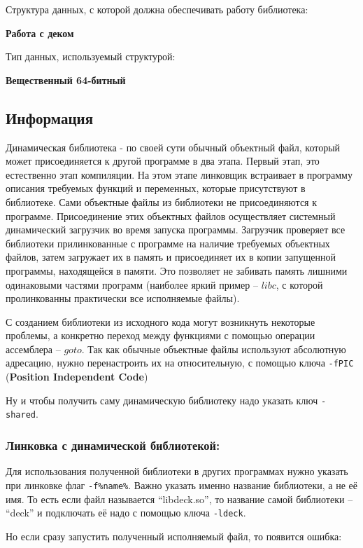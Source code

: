 \documentclass[12pt]{article}
\begin{document}
\noindent Структура данных, с которой должна обеспечивать работу библиотека:

 {\bf Работа с деком}

\noindent Тип данных, используемый структурой:

{\bf Вещественный 64-битный}

\subsection*{Информация}

Динамическая библиотека - по своей сути обычный объектный файл, который может присоединяется к другой программе в два этапа. Первый этап, это естественно этап компиляции. На этом этапе линковщик встраивает в программу описания требуемых функций и переменных, которые присутствуют в библиотеке. Сами объектные файлы из библиотеки не присоединяются к программе. Присоединение этих объектных файлов осуществляет системный динамический загрузчик во время запуска программы. Загрузчик проверяет все библиотеки прилинкованные с программе на наличие требуемых объектных файлов, затем загружает их в память и присоединяет их в копии запущенной программы, находящейся в памяти. Это позволяет не забивать память лишними одинаковыми частями программ (наиболее яркий пример -- $libc$, с которой пролинкованны практически все исполняемые файлы).


С созданием библиотеки из исходного кода могут возникнуть некоторые проблемы, а конкретно переход между функциями с помощью операции ассемблера -- $goto$. Так как обычные объектные файлы используют абсолютную адресацию, нужно перенастроить их на относительную, с помощью ключа \lstinline|-fPIC| ({\bf Position Independent Code})

Ну и чтобы получить саму динамическую библиотеку надо указать ключ \lstinline|-shared|.

\subsubsection*{Линковка с динамической библиотекой:}

Для использования полученной библиотеки в других программах нужно указать при линковке флаг \lstinline|-f%name%|. Важно указать именно название библиотеки, а не её имя. То есть если файл называется ``libdeck.so'', то название самой библиотеки -- ``deck'' и подключать её надо с помощью ключа \lstinline|-ldeck|.

Но если сразу запустить полученный исполняемый файл, то появится ошибка:
\end{document}
